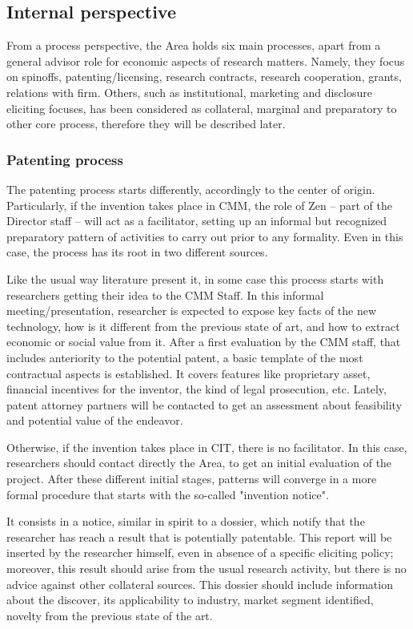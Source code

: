 \subsection{Internal perspective}

From a process perspective, the Area holds six main processes, apart from a general advisor role for economic aspects of research matters. Namely, they focus on spinoffs, patenting/licensing, research contracts, research cooperation, grants, relations with firm. Others, such as institutional, marketing and disclosure eliciting focuses, has been considered as collateral, marginal and preparatory to other core process, therefore they will be described later.

\subsubsection{Patenting process}

The patenting process starts differently, accordingly to the center of origin. Particularly, if the invention takes place in CMM, the role of Zen – part of the Director staff – will act as a facilitator, setting up an informal but recognized preparatory pattern of activities to carry out prior to any formality. Even in this case, the process has its root in two different sources.

Like the usual way literature present it, in some case this process starts with researchers getting their idea to the CMM Staff. In this informal meeting/presentation, researcher is expected to expose key facts of the new technology, how is it different from the previous state of art, and how to extract economic or social value from it. After a first evaluation by the CMM staff, that includes anteriority to the potential patent, a basic template of the most contractual aspects is established. It covers features like proprietary asset, financial incentives for the inventor, the kind of legal prosecution, etc. Lately, patent attorney partners will be contacted to get an assessment about feasibility and potential value of the endeavor. 

Otherwise, if the invention takes place in CIT, there is no facilitator. In this case, researchers should contact directly the Area, to get an initial evaluation of the project. After these different initial stages, patterns will converge in a more formal procedure that starts with the so-called "invention notice". 

It consists in a notice, similar in spirit to a dossier, which notify that the researcher has reach a result that is potentially patentable. This report will be inserted by the researcher himself, even in absence of a specific eliciting policy; moreover, this result should arise from the usual research activity, but there is no advice against other collateral sources. This dossier should include information about the discover, its applicability to industry, market segment identified, novelty from the previous state of the art. 

